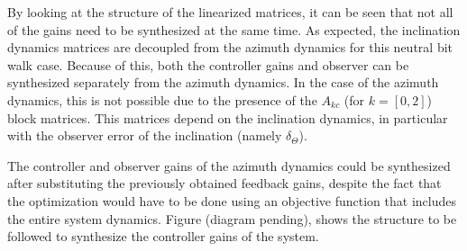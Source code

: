 \documentclass[main.tex]{subfiles}
\begin{document}
	By looking at the structure of the linearized matrices, it can be seen that not all of the gains need to be synthesized at the same time. As expected, the inclination dynamics matrices are decoupled from the azimuth dynamics for this neutral bit walk case. Because of this, both the controller gains and observer can be synthesized separately from the azimuth dynamics. In the case of the azimuth dynamics, this is not possible due to the presence of the $A_{kc}$ (for $k = [0,2]$) block matrices. This matrices depend on the inclination dynamics, in particular with the observer error of the inclination (namely $\delta_\Theta$).
	
	The controller and observer gains of the azimuth dynamics could be synthesized after substituting the previously obtained feedback gains, despite the fact that the optimization would have to be done using an objective function that includes the entire system dynamics. Figure (diagram pending), shows the structure to be followed to synthesize the controller gains of the system.


	
	\newpage
	
\end{document}
